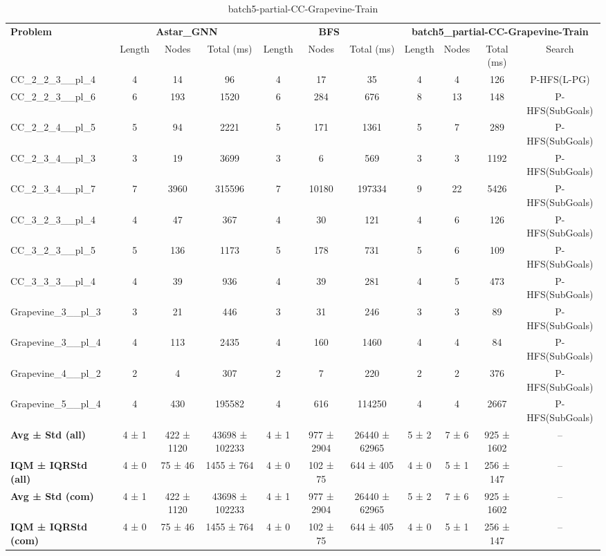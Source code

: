 \begin{table}[!ht]
\centering
\scriptsize
\begin{tabular}{l|ccc|ccc|cccc}
\multirow{2}{*}{\textbf{Problem}} & \multicolumn{3}{c|}{\textbf{Astar\_GNN}} & \multicolumn{3}{c|}{\textbf{BFS}} & \multicolumn{4}{c}{\textbf{batch5\_partial-CC-Grapevine-Train}} \\
\cline{2-11}
& Length & Nodes & Total (ms) & Length & Nodes & Total (ms) & Length & Nodes & Total (ms) & Search \\
\hline
CC\_2\_2\_3\_\_pl\_4 & 4 & 14 & 96 & 4 & 17 & 35 & 4 & 4 & 126 & P-HFS(L-PG) \\
CC\_2\_2\_3\_\_pl\_6 & 6 & 193 & 1520 & 6 & 284 & 676 & 8 & 13 & 148 & P-HFS(SubGoals) \\
CC\_2\_2\_4\_\_pl\_5 & 5 & 94 & 2221 & 5 & 171 & 1361 & 5 & 7 & 289 & P-HFS(SubGoals) \\
CC\_2\_3\_4\_\_pl\_3 & 3 & 19 & 3699 & 3 & 6 & 569 & 3 & 3 & 1192 & P-HFS(SubGoals) \\
CC\_2\_3\_4\_\_pl\_7 & 7 & 3960 & 315596 & 7 & 10180 & 197334 & 9 & 22 & 5426 & P-HFS(SubGoals) \\
CC\_3\_2\_3\_\_pl\_4 & 4 & 47 & 367 & 4 & 30 & 121 & 4 & 6 & 126 & P-HFS(SubGoals) \\
CC\_3\_2\_3\_\_pl\_5 & 5 & 136 & 1173 & 5 & 178 & 731 & 5 & 6 & 109 & P-HFS(SubGoals) \\
CC\_3\_3\_3\_\_pl\_4 & 4 & 39 & 936 & 4 & 39 & 281 & 4 & 5 & 473 & P-HFS(SubGoals) \\
Grapevine\_3\_\_pl\_3 & 3 & 21 & 446 & 3 & 31 & 246 & 3 & 3 & 89 & P-HFS(SubGoals) \\
Grapevine\_3\_\_pl\_4 & 4 & 113 & 2435 & 4 & 160 & 1460 & 4 & 4 & 84 & P-HFS(SubGoals) \\
Grapevine\_4\_\_pl\_2 & 2 & 4 & 307 & 2 & 7 & 220 & 2 & 2 & 376 & P-HFS(SubGoals) \\
Grapevine\_5\_\_pl\_4 & 4 & 430 & 195582 & 4 & 616 & 114250 & 4 & 4 & 2667 & P-HFS(SubGoals) \\
\hline
\textbf{Avg ± Std (all)} & 4 ± 1 & 422 ± 1120 & 43698 ± 102233 & 4 ± 1 & 977 ± 2904 & 26440 ± 62965 & 5 ± 2 & 7 ± 6 & 925 ± 1602 & -- \\
\textbf{IQM ± IQRStd (all)} & 4 ± 0 & 75 ± 46 & 1455 ± 764 & 4 ± 0 & 102 ± 75 & 644 ± 405 & 4 ± 0 & 5 ± 1 & 256 ± 147 & -- \\
\textbf{Avg ± Std (com)} & 4 ± 1 & 422 ± 1120 & 43698 ± 102233 & 4 ± 1 & 977 ± 2904 & 26440 ± 62965 & 5 ± 2 & 7 ± 6 & 925 ± 1602 & -- \\
\textbf{IQM ± IQRStd (com)} & 4 ± 0 & 75 ± 46 & 1455 ± 764 & 4 ± 0 & 102 ± 75 & 644 ± 405 & 4 ± 0 & 5 ± 1 & 256 ± 147 & -- \\
\end{tabular}
\caption{batch5-partial-CC-Grapevine-Train}
\label{tab:batch5_partial_CC-Grapevine_comparison_train}
\end{table}
